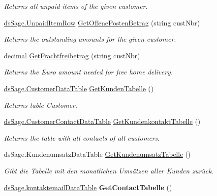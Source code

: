 \begin{DoxyCompactItemize}
\begin{DoxyCompactList}\small\item\em Returns all unpaid items of the given customer. \end{DoxyCompactList}\item 
\hyperlink{class_products_1_1_data_1_1ds_sage_1_1_unpaid_item_row}{ds\+Sage.\+Unpaid\+Item\+Row} \hyperlink{class_products_1_1_data_1_1_data_service_a0cecb3b28a79b713e36b9782d805803e}{Get\+Offene\+Posten\+Betrag} (string cust\+Nbr)
\begin{DoxyCompactList}\small\item\em Returns the outstanding amounts for the given customer. \end{DoxyCompactList}\item 
decimal \hyperlink{class_products_1_1_data_1_1_data_service_adf3c457485fb4b48d3bbb79487180c90}{Get\+Frachtfreibetrag} (string cust\+Nbr)
\begin{DoxyCompactList}\small\item\em Returns the Euro amount needed for free home delivery. \end{DoxyCompactList}\item 
\hyperlink{class_products_1_1_data_1_1ds_sage_1_1_customer_data_table}{ds\+Sage.\+Customer\+Data\+Table} \hyperlink{class_products_1_1_data_1_1_data_service_abf913d65c923eafbefefa075d8a9d674}{Get\+Kunden\+Tabelle} ()
\begin{DoxyCompactList}\small\item\em Returns table Customer. \end{DoxyCompactList}\item 
\hyperlink{class_products_1_1_data_1_1ds_sage_1_1_customer_contact_data_table}{ds\+Sage.\+Customer\+Contact\+Data\+Table} \hyperlink{class_products_1_1_data_1_1_data_service_a475549fc8078d14e60c2b6584ac9f6de}{Get\+Kundenkontakt\+Tabelle} ()
\begin{DoxyCompactList}\small\item\em Returns the table with all contacts of all customers. \end{DoxyCompactList}\item 
ds\+Sage.\+Kundenumsatz\+Data\+Table \hyperlink{class_products_1_1_data_1_1_data_service_a6bbb19751f77e64d649d13ce09db150d}{Get\+Kundenumsatz\+Tabelle} ()
\begin{DoxyCompactList}\small\item\em Gibt die Tabelle mit den monatlichen Umsätzen aller Kunden zurück. \end{DoxyCompactList}\item 
\hyperlink{class_products_1_1_data_1_1ds_sage_1_1kontaktemail_data_table}{ds\+Sage.\+kontaktemail\+Data\+Table} {\bfseries Get\+Contact\+Tabelle} ()\hypertarget{class_products_1_1_data_1_1_data_service_a7f00075e7903bca4ce7e539005d6408d}{}\label{class_products_1_1_data_1_1_data_service_a7f00075e7903bca4ce7e539005d6408d}


\end{DoxyCompactItemize}
